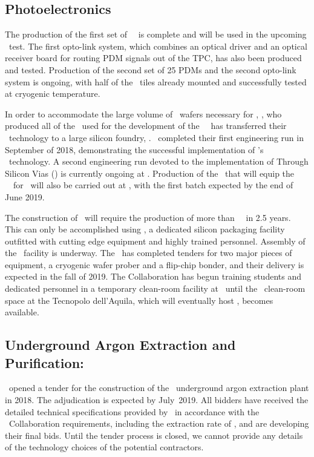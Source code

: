 \subsection{Photoelectronics}
\label{sec:PhotoElectronics}

The production of the first set of \DSkSQBPdmsNumber\ \DSkPdms\ is complete and will be used in the upcoming \DSzs\ test. The first opto-link system, which combines an optical driver and an optical receiver board for routing PDM signals out of the TPC, has also been produced and tested.  Production of the second set of 25 PDMs and the second opto-link system is ongoing, with half of the \SiPM\ tiles already mounted and successfully tested at cryogenic temperature.  

In order to accommodate the large volume of \SiPM\ wafers necessary for \DSks, \FBK, who produced all of the \SiPMs\ used for the development of the \DS\ \DSkPdms\, has transferred their \SiPM\ technology to a large silicon foundry, \LFoundry. \LFoundry\ completed their first engineering run in September of 2018, demonstrating the successful implementation of  \FBK's \SiPM\ technology.  A second engineering run devoted to the implementation of Through Silicon Vias (\TSVs) is currently ongoing at \LFoundry. Production of the \SiPMs\ that will equip the \DSkPdmsSecondBatchNumber~\DSkPdms\ for \DSps\ will also be carried out at \LFoundry, with the first batch expected by the end of June 2019.

The construction of \DSks\ will require the production of more than \DSkPdmsNumber\ \DSkPdms\ in 2.5 years.  This can only be accomplished using \NOA, a dedicated silicon packaging facility outfitted with cutting edge equipment and highly trained personnel. Assembly of the \NOA\ facility is underway. The \INFN\ has completed tenders for two major pieces of equipment, a cryogenic wafer prober and a flip-chip bonder, and their delivery is expected in the fall of 2019.  The Collaboration has begun training students and dedicated personnel in a temporary clean-room facility at \LNGS\ until the \DSkPdmsCleanRoomSurface\ clean-room space at the Tecnopolo dell'Aquila, which will eventually host \NOA, becomes available.


\subsection{Underground Argon Extraction and Purification: \Urania}
\label{sec:Urania}

\INFN\ opened a tender for the construction of the \Urania\ underground argon extraction plant in 2018.  The adjudication is expected by July~2019.  All bidders have received the detailed technical specifications provided by \INFN\ in accordance with the \GADMC\ Collaboration requirements, including the extraction rate of \UraniaUArRate, and are developing their final bids. Until the tender process is closed, we cannot provide any details of the technology choices of the potential contractors.

